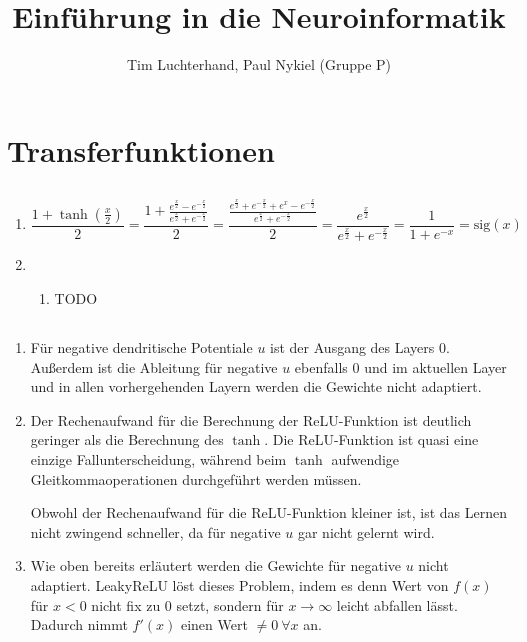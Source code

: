 \documentclass[DIN, pagenumber=false, fontsize=11pt, parskip=half]{scrartcl}
\title{Einführung in die Neuroinformatik}
\author{Tim Luchterhand, Paul Nykiel (Gruppe P)}
\begin{document}
    \maketitle
    \section{Transferfunktionen}
    \subsection{}
    \begin{enumerate}[label=\alph*)]
        \item 
            \begin{equation*}
                \frac{1+\tanh \left( \frac{x}{2} \right)}{2} 
                = \frac{1 + \frac{e^\frac{x}{2} - e^{-\frac{x}{2}}}{e^\frac{x}{2} + e^{-\frac{x}{2}}}}{2} 
                = \frac{\frac{e^\frac{x}{2} + e^{-\frac{x}{2}} + e^{x} - e^{-\frac{x}{2}}}{e^\frac{x}{2}+e^{-\frac{x}{2}}}}{2} 
                = \frac{e^{\frac{x}{2}}}{e^\frac{x}{2} + e^{-\frac{x}{2}}}
                = \frac{1}{1+e^{-x}} = \text{sig} (x)
            \end{equation*}
        \item $ $
            \begin{enumerate}[label=\roman*.]
                \item TODO
            \end{enumerate}
    \end{enumerate}

    \subsection{}
    \begin{enumerate}[label=\alph*)]
        \item 
            Für negative dendritische Potentiale $u$ ist der Ausgang des Layers 0. Außerdem ist die Ableitung für negative $u$ ebenfalls $0$ und im aktuellen
            Layer und in allen vorhergehenden Layern werden die Gewichte nicht adaptiert.
        \item 
            Der Rechenaufwand für die Berechnung der ReLU-Funktion ist deutlich geringer als die Berechnung des $\tanh$. Die ReLU-Funktion ist quasi eine einzige Fallunterscheidung, während beim $\tanh$ aufwendige Gleitkommaoperationen durchgeführt werden müssen.

            Obwohl der Rechenaufwand für die ReLU-Funktion kleiner ist, ist das Lernen nicht zwingend schneller, da für negative $u$ gar nicht gelernt wird.
        \item 
            Wie oben bereits erläutert werden die Gewichte für negative $u$ nicht adaptiert. LeakyReLU löst dieses Problem, indem es denn Wert von $f(x)$ für $x < 0$ nicht fix zu $0$ setzt, sondern für $x \to \infty$ leicht abfallen lässt. Dadurch nimmt $f'(x)$ einen Wert $\neq 0\ \forall x$ an.
    \end{enumerate}
\end{document}
